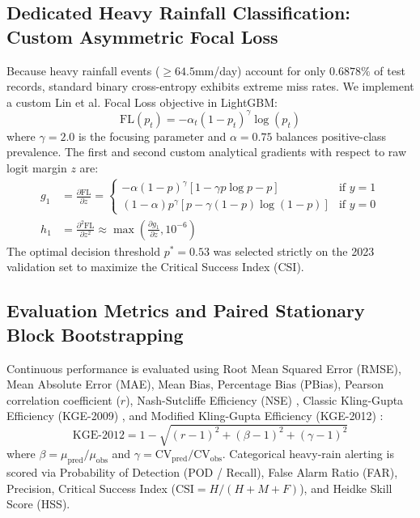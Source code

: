 \documentclass[12pt]{article}
\begin{document}
\subsection{Dedicated Heavy Rainfall Classification: Custom Asymmetric Focal Loss}
Because heavy rainfall events ($\ge 64.5$\;mm/day) account for only $0.6878\%$ of test records, standard binary cross-entropy exhibits extreme miss rates. We implement a custom Lin et al. \cite{lin2017} Focal Loss objective in LightGBM:
\begin{equation}
\text{FL}(p_t) = -\alpha_t (1 - p_t)^\gamma \log(p_t)
\end{equation}
where $\gamma = 2.0$ is the focusing parameter and $\alpha = 0.75$ balances positive-class prevalence. The first and second custom analytical gradients with respect to raw logit margin $z$ are:
\begin{align}
g_1 &= \frac{\partial \text{FL}}{\partial z} = \begin{cases}
-\alpha (1 - p)^\gamma [1 - \gamma p \log p - p] & \text{if } y = 1 \\
(1 - \alpha) p^\gamma [p - \gamma (1 - p) \log(1 - p)] & \text{if } y = 0
\end{cases} \\
h_1 &= \frac{\partial^2 \text{FL}}{\partial z^2} \approx \max\left( \frac{\partial g_1}{\partial z}, 10^{-6} \right)
\end{align}
The optimal decision threshold $p^* = 0.53$ was selected strictly on the 2023 validation set to maximize the Critical Success Index (CSI).

\subsection{Evaluation Metrics and Paired Stationary Block Bootstrapping}
Continuous performance is evaluated using Root Mean Squared Error (RMSE), Mean Absolute Error (MAE), Mean Bias, Percentage Bias (PBias), Pearson correlation coefficient ($r$), Nash-Sutcliffe Efficiency (NSE) \cite{nash1970}, Classic Kling-Gupta Efficiency (KGE-2009) \cite{gupta2009}, and Modified Kling-Gupta Efficiency (KGE-2012) \cite{kling2012}:
\begin{equation}
\text{KGE-2012} = 1 - \sqrt{(r - 1)^2 + (\beta - 1)^2 + (\gamma - 1)^2}
\end{equation}
where $\beta = \mu_{\text{pred}} / \mu_{\text{obs}}$ and $\gamma = \text{CV}_{\text{pred}} / \text{CV}_{\text{obs}}$. Categorical heavy-rain alerting is scored via Probability of Detection (POD / Recall), False Alarm Ratio (FAR), Precision, Critical Success Index ($\text{CSI} = H / (H + M + F)$), and Heidke Skill Score (HSS).
\end{document}
